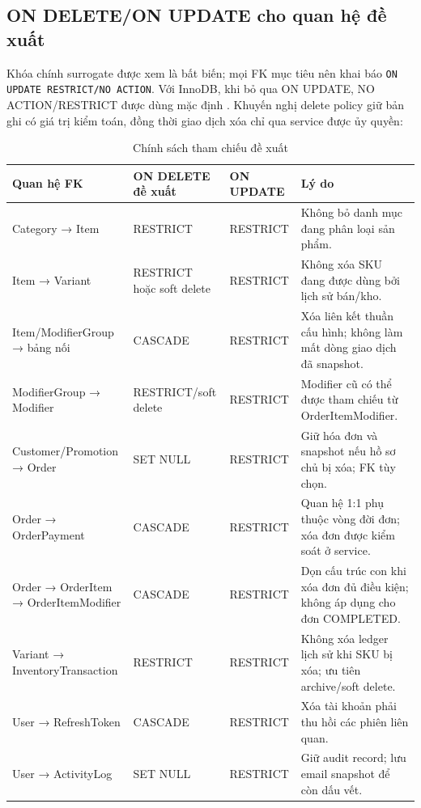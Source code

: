 \documentclass[12pt,a4paper,oneside]{report}
\begin{document}
\subsection{ON DELETE/ON UPDATE cho quan hệ đề xuất}
Khóa chính surrogate được xem là bất biến; mọi FK mục tiêu nên khai báo \texttt{ON UPDATE RESTRICT/NO ACTION}. Với InnoDB, khi bỏ qua ON UPDATE, NO ACTION/RESTRICT được dùng mặc định \cite{mysqlfk}. Khuyến nghị delete policy giữ bản ghi có giá trị kiểm toán, đồng thời giao dịch xóa chỉ qua service được ủy quyền:
\begin{table}[htbp]
\centering\small
\caption{Chính sách tham chiếu đề xuất}
\begin{tabularx}{\textwidth}{@{}p{3.5cm}p{4.2cm}p{3.1cm}Y@{}}\toprule
Quan hệ FK & ON DELETE đề xuất & ON UPDATE & Lý do\\\midrule
Category → Item & RESTRICT & RESTRICT & Không bỏ danh mục đang phân loại sản phẩm.\\
Item → Variant & RESTRICT hoặc soft delete & RESTRICT & Không xóa SKU đang được dùng bởi lịch sử bán/kho.\\
Item/ModifierGroup → bảng nối & CASCADE & RESTRICT & Xóa liên kết thuần cấu hình; không làm mất dòng giao dịch đã snapshot.\\
ModifierGroup → Modifier & RESTRICT/soft delete & RESTRICT & Modifier cũ có thể được tham chiếu từ OrderItemModifier.\\
Customer/Promotion → Order & SET NULL & RESTRICT & Giữ hóa đơn và snapshot nếu hồ sơ chủ bị xóa; FK tùy chọn.\\
Order → OrderPayment & CASCADE & RESTRICT & Quan hệ 1:1 phụ thuộc vòng đời đơn; xóa đơn được kiểm soát ở service.\\
Order → OrderItem → OrderItemModifier & CASCADE & RESTRICT & Dọn cấu trúc con khi xóa đơn đủ điều kiện; không áp dụng cho đơn COMPLETED.\\
Variant → InventoryTransaction & RESTRICT & RESTRICT & Không xóa ledger lịch sử khi SKU bị xóa; ưu tiên archive/soft delete.\\
User → RefreshToken & CASCADE & RESTRICT & Xóa tài khoản phải thu hồi các phiên liên quan.\\
User → ActivityLog & SET NULL & RESTRICT & Giữ audit record; lưu email snapshot để còn dấu vết.\\
\bottomrule\end{tabularx}
\end{table}
\end{document}
